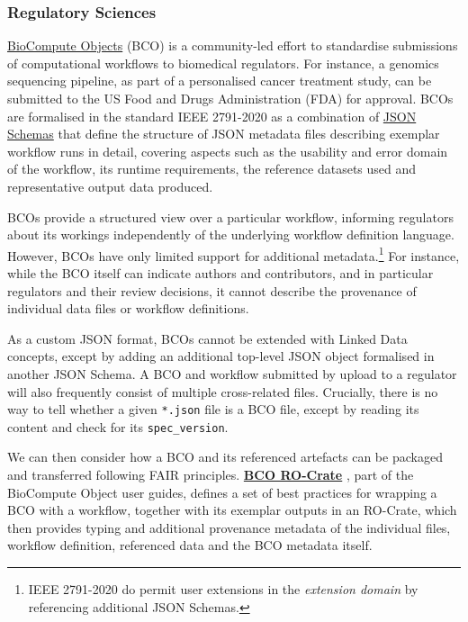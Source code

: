 {\hypertarget{regulatorysciences}{%
\subsubsection{Regulatory Sciences}\label{regulatorysciences}}

\href{https://biocomputeobject.org/}{BioCompute Objects} (BCO)
\cite{Alterovitz 2018} is a
community-led effort to standardise submissions of computational
workflows to biomedical regulators. For instance, a genomics sequencing
pipeline, as part of a personalised cancer treatment study, can be
submitted to the US Food and Drugs Administration (FDA) for approval.
BCOs are formalised in the standard IEEE 2791-2020
\cite{ch5-64}
as a combination of \href{https://w3id.org/ieee/ieee-2791-schema/}{JSON
Schemas} that define the structure of JSON metadata files describing
exemplar workflow runs in detail, covering aspects such as the usability
and error domain of the workflow, its runtime requirements, the
reference datasets used and representative output data produced.

BCOs provide a structured view over a particular workflow, informing
regulators about its workings independently of the underlying workflow
definition language. However, BCOs have only limited support for
additional metadata.\footnote{IEEE 2791-2020 do permit user extensions
  in the \emph{extension domain} by referencing additional JSON Schemas.}
For instance, while the BCO itself can indicate authors and
contributors, and in particular regulators and their review decisions,
it cannot describe the provenance of individual data files or workflow
definitions.

As a custom JSON format, BCOs cannot be extended with Linked Data
concepts, except by adding an additional top-level JSON object
formalised in another JSON Schema. A BCO and workflow submitted by
upload to a regulator will also frequently consist of multiple
cross-related files. Crucially, there is no way to tell whether a given
\texttt{*.json} file is a BCO file, except by reading its content and
check for its \texttt{spec\_version}.

We can then consider how a BCO and its referenced artefacts can be
packaged and transferred following FAIR principles.
\href{https://biocompute-objects.github.io/bco-ro-crate/}{\textbf{BCO
RO-Crate}} \cite{ch5-109},
part of the BioCompute Object user guides, defines a set of best
practices for wrapping a BCO with a workflow, together with its exemplar
outputs in an RO-Crate, which then provides typing and additional
provenance metadata of the individual files, workflow definition,
referenced data and the BCO metadata itself.

}
